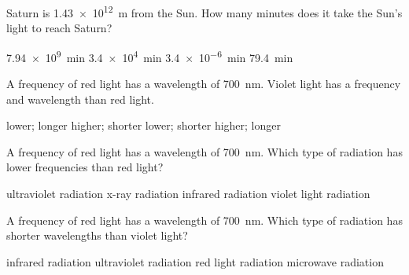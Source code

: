 \documentclass{exam}
\begin{document}
\begin{questions}
\question %
Saturn is \SI{1.43e12}{m} from the Sun. How many minutes does it take the Sun’s light to reach Saturn?

\begin{choices}
\choice \SI{7.94e9}{min}
\choice \SI{3.4e4}{min}
\choice \SI{3.4e-6}{min}
\choice \SI{79.4}{min}
\end{choices}


\question %
A frequency of red light has a wavelength of \SI{700}{nm}. Violet light has a \fillin[higher] frequency and \fillin[shorter] wavelength than red light.

\vspace{0.5em}

\begin{choices}
\choice lower; longer
\CorrectChoice higher; shorter
\choice lower; shorter
\choice higher; longer
\end{choices}



\question %
A frequency of red light has a wavelength of \SI{700}{nm}. Which type of radiation has lower frequencies than red light?

\vspace{0.5em}

\begin{choices}
\choice ultraviolet radiation
\choice x-ray radiation
\CorrectChoice infrared radiation
\choice violet light radiation

\end{choices}


\question %
A frequency of red light has a wavelength of \SI{700}{nm}. Which type of radiation has shorter wavelengths than violet light?

\vspace{0.5em}

\begin{choices}
\choice infrared radiation
\CorrectChoice ultraviolet radiation
\choice red light radiation
\choice microwave radiation
\end{choices}



\end{questions}
\end{document}
